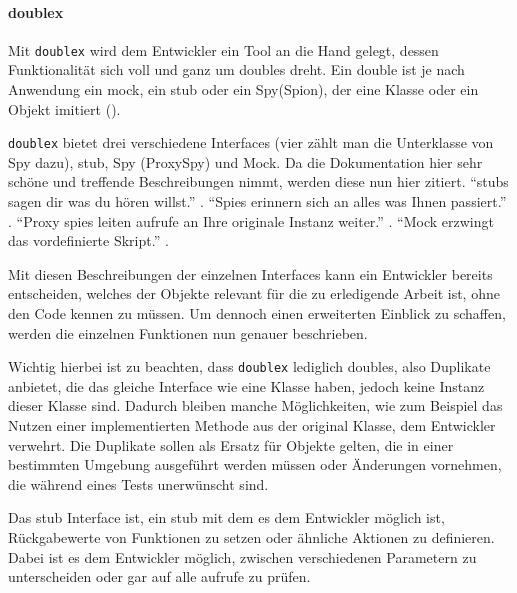 \paragraph{doublex}\label{python-tools:doublex}\mbox{}
\newline
Mit \lstinline{doublex} wird dem Entwickler ein Tool an die Hand gelegt,
dessen Funktionalität sich voll und ganz um doubles dreht. Ein double ist je
nach Anwendung ein \Gls{mock}, ein \Gls{stub} oder ein Spy(Spion), der eine
Klasse oder ein Objekt imitiert (\cite{doublex:docs:1.8.1}).
\newline

\lstinline{doublex} bietet drei verschiedene Interfaces (vier zählt man die
Unterklasse von Spy dazu), \Gls{stub}, Spy (ProxySpy) und Mock. Da die
Dokumentation hier sehr schöne und treffende Beschreibungen nimmt, werden diese 
nun hier zitiert. "`\Glspl{stub} sagen dir was du hören 
willst."' 
. "`Spies erinnern sich 
an alles was Ihnen passiert."' 
. "`Proxy spies leiten aufrufe an Ihre originale 
Instanz weiter."' . "`Mock 
erzwingt das vordefinierte Skript."' 
.

Mit diesen Beschreibungen der einzelnen Interfaces kann ein Entwickler bereits
entscheiden, welches der Objekte relevant für die zu erledigende Arbeit ist, 
ohne
den Code kennen zu müssen. Um dennoch einen erweiterten Einblick zu
schaffen, werden die einzelnen Funktionen nun genauer beschrieben.

Wichtig hierbei ist zu beachten, dass \lstinline{doublex} lediglich
doubles, also Duplikate anbietet, die das gleiche Interface wie eine Klasse
haben, jedoch keine Instanz dieser Klasse sind. Dadurch bleiben manche
Möglichkeiten, wie zum Beispiel das Nutzen einer
implementierten Methode aus der original Klasse, dem Entwickler verwehrt.
Die Duplikate sollen als Ersatz für Objekte gelten, die in einer bestimmten
Umgebung ausgeführt werden müssen oder Änderungen vornehmen, die während
eines Tests unerwünscht sind.
\newline

Das \Gls{stub} Interface ist, ein
\Gls{stub} mit dem es dem Entwickler möglich ist, Rückgabewerte von Funktionen
zu setzen oder ähnliche Aktionen zu definieren. Dabei ist es dem Entwickler
möglich, zwischen verschiedenen Parametern zu unterscheiden oder gar auf alle
aufrufe zu prüfen.

